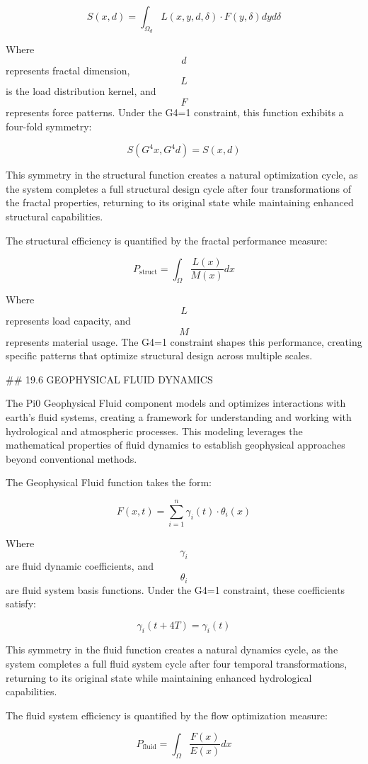 $$ S(x, d) = \int_{\Omega_d} L(x, y, d, \delta) \cdot F(y, \delta) dy d\delta $$

Where $$ d $$ represents fractal dimension, $$ L $$ is the load distribution kernel, and $$ F $$ represents force patterns. Under the G4=1 constraint, this function exhibits a four-fold symmetry:

$$ S(G^4 x, G^4 d) = S(x, d) $$

This symmetry in the structural function creates a natural optimization cycle, as the system completes a full structural design cycle after four transformations of the fractal properties, returning to its original state while maintaining enhanced structural capabilities.

The structural efficiency is quantified by the fractal performance measure:

$$ P_{\text{struct}} = \int_{\Omega} \frac{L(x)}{M(x)} dx $$

Where $$ L $$ represents load capacity, and $$ M $$ represents material usage. The G4=1 constraint shapes this performance, creating specific patterns that optimize structural design across multiple scales.

## 19.6 GEOPHYSICAL FLUID DYNAMICS

The Pi0 Geophysical Fluid component models and optimizes interactions with earth's fluid systems, creating a framework for understanding and working with hydrological and atmospheric processes. This modeling leverages the mathematical properties of fluid dynamics to establish geophysical approaches beyond conventional methods.

The Geophysical Fluid function takes the form:

$$ F(x, t) = \sum_{i=1}^{n} \gamma_i(t) \cdot \theta_i(x) $$

Where $$ \gamma_i $$ are fluid dynamic coefficients, and $$ \theta_i $$ are fluid system basis functions. Under the G4=1 constraint, these coefficients satisfy:

$$ \gamma_i(t+4T) = \gamma_i(t) $$

This symmetry in the fluid function creates a natural dynamics cycle, as the system completes a full fluid system cycle after four temporal transformations, returning to its original state while maintaining enhanced hydrological capabilities.

The fluid system efficiency is quantified by the flow optimization measure:

$$ P_{\text{fluid}} = \int_{\Omega} \frac{F(x)}{E(x)} dx $$

